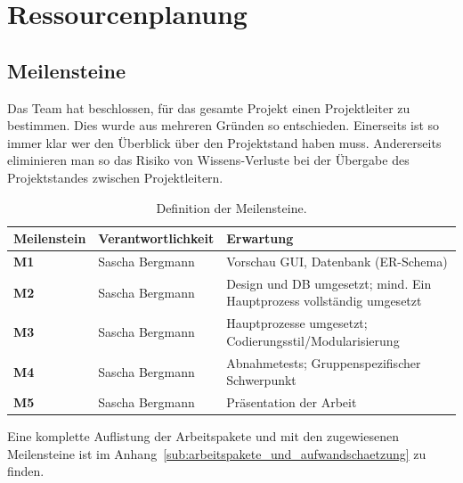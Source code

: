 \section{Ressourcenplanung}
\subsection{Meilensteine}
Das Team hat beschlossen, für das gesamte Projekt einen Projektleiter zu bestimmen. Dies wurde aus mehreren Gründen so entschieden.
Einerseits ist so immer klar wer den Überblick über den Projektstand haben muss. Andererseits eliminieren man so das Risiko von Wissens-Verluste bei der Übergabe des Projektstandes zwischen Projektleitern.\\

\begin{table}[H]
\centering
\begin{tabularx}{\textwidth-1cm}{|l|l|X|} \hline
\textbf{Meilenstein}	& \textbf{Verantwortlichkeit} &	\textbf{Erwartung} \\ \hline
\textbf{M1}	&Sascha Bergmann	&Vorschau GUI, Datenbank (ER-Schema) \\  \hline
\textbf{M2}	&Sascha Bergmann	&Design und DB umgesetzt; mind. Ein Hauptprozess vollständig umgesetzt \\ \hline
\textbf{M3}	&Sascha Bergmann	&Hauptprozesse umgesetzt; Codierungsstil/Modularisierung \\ \hline
\textbf{M4}	&Sascha Bergmann	&Abnahmetests; Gruppenspezifischer Schwerpunkt \\ \hline
\textbf{M5}	&Sascha Bergmann	&Präsentation der Arbeit \\ \hline
\end{tabularx}
\caption{Definition der Meilensteine.}
\end{table}

Eine komplette Auflistung der Arbeitspakete und mit den zugewiesenen Meilensteine ist im Anhang~\ref{sub:arbeitspakete_und_aufwandschaetzung} zu finden.  

